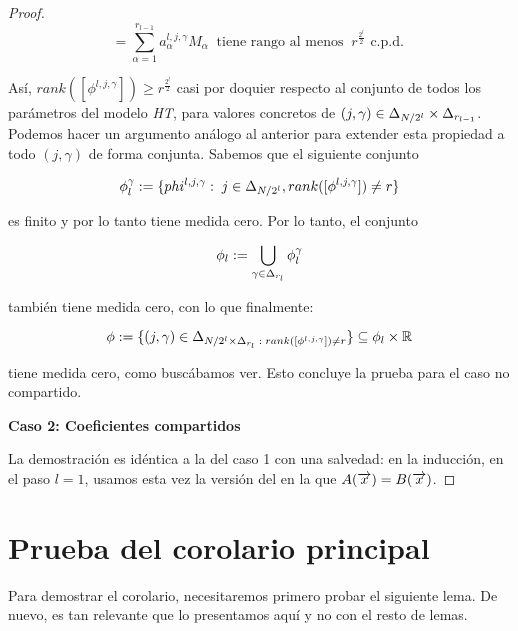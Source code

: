 \begin{proof}
    \begin{equation}
        [\phi^{l, j, \gamma}] = \sum_{\alpha = 1}^{r_{l-1}} a_\alpha^{l,j,\gamma} M_\alpha \;\; \text{tiene rango al menos} \; \; r^{\frac{2^l}{2}} \text{ c.p.d. }
    \end{equation}

    Así, $rank([\phi^{l, j, \gamma}]) \geq r^{\frac{2^l}{2}}$ casi por doquier respecto al conjunto de todos los parámetros del modelo \textit{HT}, para valores concretos de $(j, \gamma) \in \Delta_{N/2^l} \times \Delta_{r_{l-1}}$. Podemos hacer un argumento análogo al anterior para extender esta propiedad a todo $(j, \gamma)$ de forma conjunta. Sabemos que el siguiente conjunto

    \begin{equation}
        \phi_l^{\gamma} := \{ phi^{l, j, \gamma}: \; j \in \Delta_{N/2^l}, rank([\phi^{l, j, \gamma}]) \neq r \}
    \end{equation}

    es finito y por lo tanto tiene medida cero. Por lo tanto, el conjunto

    \begin{equation}
        \phi_l := \bigcup_{\gamma \in \Delta_{r_l}} \phi_l^{\gamma}
    \end{equation}

    también tiene medida cero, con lo que finalmente:

    \begin{equation}
        \phi := \{ (j, \gamma) \in \Delta_{N/2^l \times \Delta_{r_l} \; : \; rank([\phi^{l, j, \gamma}]) \neq r} \} \subseteq \phi_l \times \mathbb{R}
    \end{equation}

    tiene medida cero, como buscábamos ver. Esto concluye la prueba para el caso no compartido.

    \textbf{Caso 2: Coeficientes compartidos}

    La demostración es idéntica a la del caso 1 con una salvedad: en la inducción, en el paso $l = 1$, usamos esta vez la versión del  en la que $A(\overrightarrow{x}) = B(\overrightarrow{x})$.
\end{proof}

\section{Prueba del corolario principal}

Para demostrar el corolario, necesitaremos primero probar el siguiente lema. De nuevo, es tan relevante que lo presentamos aquí y no con el resto de lemas.

